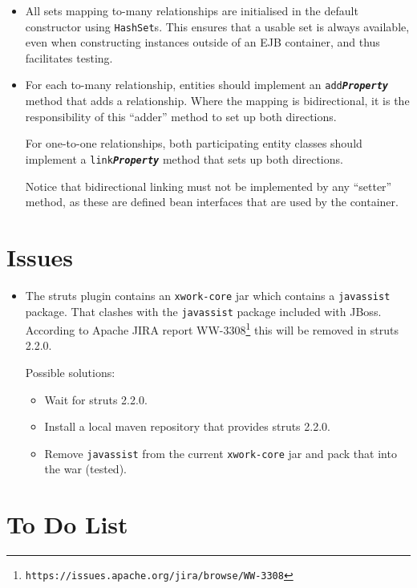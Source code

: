 \documentclass[a4paper,fleqn]{article}
\newcommand{\computercode}[1]{\texttt{#1}}
\newcommand{\computermeta}[1]{\texttt{\textbf{\textit{#1}}}}
\begin{document}
\begin{itemize}
\item All sets mapping to-many relationships are initialised in the
  default constructor using \computercode{HashSet}s. This ensures that
  a usable set is always available, even when constructing instances
  outside of an EJB container, and thus facilitates testing.

\item For each to-many relationship, entities should implement an
  \computercode{add\computermeta{Property}} method that adds a
  relationship. Where the mapping is bidirectional, it is the
  responsibility of this ``adder'' method to set up both directions.

  For one-to-one relationships, both participating entity classes
  should implement a \computercode{link\computermeta{Property}} method
  that sets up both directions.

  Notice that bidirectional linking must not be implemented by any
  ``setter'' method, as these are defined bean interfaces that are
  used by the container.

\end{itemize}


\section{Issues}

\begin{itemize}

\item The struts plugin contains an \computercode{xwork-core} jar
  which contains a \computercode{javassist} package. That clashes with
  the \computercode{javassist} package included with JBoss. According
  to Apache JIRA report
  WW-3308\footnote{\computercode{https://issues.apache.org/jira/browse/WW-3308}}
  this will be removed in struts 2.2.0.

  Possible solutions:
  \begin{itemize}
  \item Wait for struts 2.2.0.
  \item Install a local maven repository that provides struts 2.2.0.
  \item Remove \computercode{javassist} from the current
    \computercode{xwork-core} jar and pack that into the war (tested).
  \end{itemize}

\end{itemize}


\section{To Do List}
\end{document}
